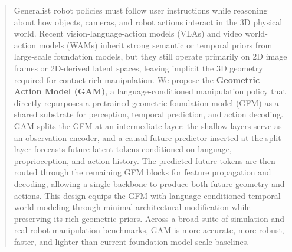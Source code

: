 \begin{abstract}
Generalist robot policies must follow user instructions while reasoning about how objects, cameras, and robot actions interact in the 3D physical world. Recent vision-language-action models (VLAs) and video world-action models (WAMs) inherit strong semantic or temporal priors from large-scale foundation models, but they still operate primarily on 2D image frames or 2D-derived latent spaces, leaving implicit the 3D geometry required for contact-rich manipulation. We propose the \textbf{Geometric Action Model (GAM)}, a language-conditioned manipulation policy that directly repurposes a pretrained geometric foundation model (GFM) as a shared substrate for perception, temporal prediction, and action decoding. GAM splits the GFM at an intermediate layer: the shallow layers serve as an observation encoder, and a causal future predictor inserted at the split layer forecasts future latent tokens conditioned on language, proprioception, and action history. The predicted future tokens are then routed through the remaining GFM blocks for feature propagation and decoding, allowing a single backbone to produce both future geometry and actions. This design equips the GFM with language-conditioned temporal world modeling through minimal architectural modification while preserving its rich geometric priors. Across a broad suite of simulation and real-robot manipulation benchmarks, GAM is more accurate, more robust, faster, and lighter than current foundation-model-scale baselines.
\end{abstract}